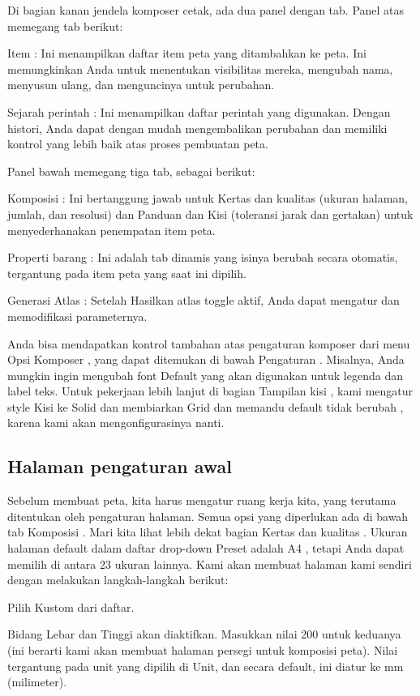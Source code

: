 \documentclass[]{book}
\begin{document}
Di bagian kanan jendela komposer cetak, ada dua panel dengan tab. Panel atas memegang tab berikut:

Item :
Ini menampilkan daftar item peta yang ditambahkan ke peta. Ini memungkinkan Anda untuk menentukan visibilitas mereka, mengubah nama, menyusun ulang, dan menguncinya untuk perubahan.

Sejarah perintah :
Ini menampilkan daftar perintah yang digunakan. Dengan histori, Anda dapat dengan mudah mengembalikan perubahan dan memiliki kontrol yang lebih baik atas proses pembuatan peta.

Panel bawah memegang tiga tab, sebagai berikut:

Komposisi :
Ini bertanggung jawab untuk Kertas dan kualitas (ukuran halaman, jumlah, dan resolusi) dan Panduan dan Kisi (toleransi jarak dan gertakan) untuk menyederhanakan penempatan item peta.

Properti barang :
Ini adalah tab dinamis yang isinya berubah secara otomatis, tergantung pada item peta yang saat ini dipilih.

Generasi Atlas :
Setelah Hasilkan atlas toggle aktif, Anda dapat mengatur dan memodifikasi parameternya.

Anda bisa mendapatkan kontrol tambahan atas pengaturan komposer dari menu Opsi Komposer , yang dapat ditemukan di bawah Pengaturan . Misalnya, Anda mungkin ingin mengubah font Default yang akan digunakan untuk legenda dan label teks. Untuk pekerjaan lebih lanjut di bagian Tampilan kisi , kami mengatur style Kisi ke Solid dan membiarkan Grid dan memandu default tidak berubah , karena kami akan mengonfigurasinya nanti.

\hypertarget{halaman-pengaturan-awal}{%
\subsection{Halaman pengaturan awal}\label{halaman-pengaturan-awal}}

Sebelum membuat peta, kita harus mengatur ruang kerja kita, yang terutama ditentukan oleh pengaturan halaman. Semua opsi yang diperlukan ada di bawah tab Komposisi . Mari kita lihat lebih dekat bagian Kertas dan kualitas . Ukuran halaman default dalam daftar drop-down Preset adalah A4 , tetapi Anda dapat memilih di antara 23 ukuran lainnya. Kami akan membuat halaman kami sendiri dengan melakukan langkah-langkah berikut:

Pilih Kustom dari daftar.

Bidang Lebar dan Tinggi akan diaktifkan. Masukkan nilai 200 untuk keduanya (ini berarti kami akan membuat halaman persegi untuk komposisi peta). Nilai tergantung pada unit yang dipilih di Unit, dan secara default, ini diatur ke mm (milimeter).
\end{document}
